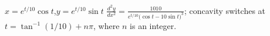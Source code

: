 {$x=e^{t/10}\cos t$,\quad  $y=e^{t/10}\sin t$}
{$\frac{d^2y}{dx^2}=\frac{1010}{e^{t/10}\big(\cos t-10\sin t\big)^3}$; concavity switches at $t=\tan^{-1}(1/10)+n\pi$, where $n$ is an integer.}
